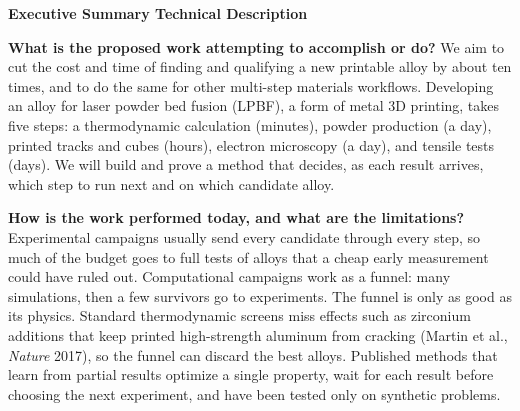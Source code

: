 \documentclass[12pt,letterpaper]{article}
\newcommand{\q}[1]{\textbf{#1}\enspace}
\begin{document}
\clearpage

{\bfseries Executive Summary Technical Description\par}
\vspace{2pt}

\q{What is the proposed work attempting to accomplish or do?}
We aim to cut the cost and time of finding and qualifying a new printable
alloy by about ten times, and to do the same for other multi-step materials
workflows. Developing an alloy for laser powder bed fusion (LPBF), a form of
metal 3D printing, takes five steps: a thermodynamic
calculation (minutes), powder production (a day), printed tracks and cubes
(hours), electron microscopy (a day), and tensile tests (days). We will
build and prove a method that decides, as each result arrives, which step to
run next and on which candidate alloy.

\q{How is the work performed today, and what are the limitations?}
Experimental campaigns usually send every candidate through every step, so
much of the budget goes to full tests of alloys that a cheap early
measurement could have ruled out. Computational campaigns work as a funnel:
many simulations, then a few survivors go to experiments. The funnel is only
as good as its physics. Standard thermodynamic screens miss effects such as
zirconium additions that keep printed high-strength
aluminum from cracking (Martin et al.,
\emph{Nature} 2017), so the funnel can discard the best alloys. Published
methods that learn from partial results optimize a single property, wait
for each result before choosing the next experiment, and have been tested only on synthetic problems.
\end{document}
